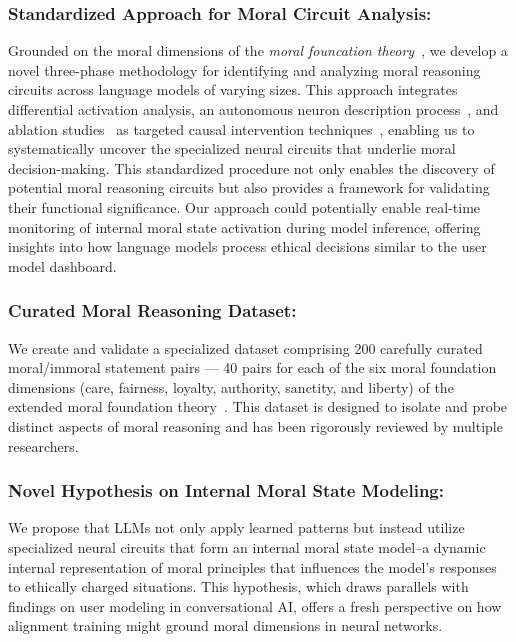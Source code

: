 \subsubsection{Standardized Approach for Moral Circuit Analysis:}
Grounded on the moral dimensions of the \emph{moral founcation theory}~\cite{Haidt2004}, we develop a novel three-phase methodology for identifying and analyzing moral reasoning circuits across language models of varying sizes. This approach integrates differential activation analysis, an autonomous neuron description process~\cite{bills2023language}, and ablation studies~\cite{Zhou2018} as targeted causal intervention techniques~\cite{Yamakoshi2023}, enabling us to systematically uncover the specialized neural circuits that underlie moral decision-making.
This standardized procedure not only enables the discovery of potential moral reasoning circuits but also provides a framework for validating their functional significance. Our approach could potentially enable real-time monitoring of internal moral state activation during model inference, offering insights into how language models process ethical decisions similar to the user model dashboard.\cite{chen_designing_2024}

\subsubsection{Curated Moral Reasoning Dataset:}
We create and validate a specialized dataset comprising 200 carefully curated moral/immoral statement pairs — 40 pairs for each of the six moral foundation dimensions (care, fairness, loyalty, authority, sanctity, and liberty) of the extended moral foundation theory~\cite{Haidt2012}. This dataset is designed to isolate and probe distinct aspects of moral reasoning and has been rigorously reviewed by multiple researchers.


\subsubsection{Novel Hypothesis on Internal Moral State Modeling:}
We propose that LLMs not only apply learned patterns but instead utilize specialized neural circuits that form an internal moral state model--a dynamic internal representation of moral principles that influences the model's responses to ethically charged situations. This hypothesis, which draws parallels with findings on user modeling in conversational AI, offers a fresh perspective on how alignment training might ground moral dimensions in neural networks.

